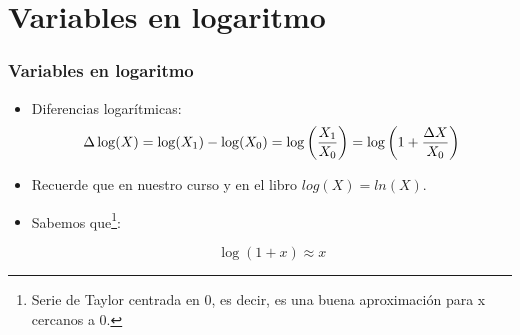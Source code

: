 \documentclass{beamer}
\begin{document}
\section{Variables en logaritmo}

\begin{frame}
\frametitle{Variables en logaritmo}

\begin{itemize}
    \item Diferencias logarítmicas:
    \[
    \Delta \log(X)= \log(X_1)-\log(X_0)= \log\left (\frac{ X_1}{X_0}\right )=\log\left(1+{\Delta X\over X_0} \right)
    \]
    \item Recuerde que en nuestro curso y en el libro $log(X)=ln(X)$.
    \item Sabemos que\footnote{Serie de Taylor centrada en 0, es decir, es una buena aproximación para x cercanos a 0.}:

    \[
    \log(1+x) \approx x
    \]

\end{itemize}



\end{frame}
\end{document}
